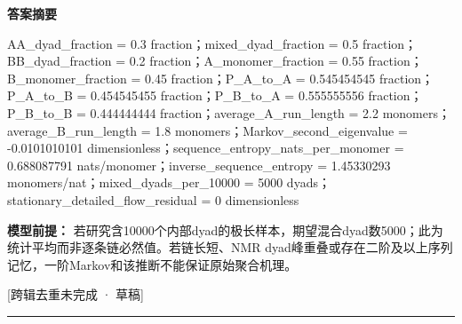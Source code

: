 \documentclass[UTF8,11pt,a4paper]{ctexart}
\begin{document}
\noindent\textbf{答案摘要}\par
AA\_dyad\_fraction = 0.3 fraction；mixed\_dyad\_fraction = 0.5 fraction；BB\_dyad\_fraction = 0.2 fraction；A\_monomer\_fraction = 0.55 fraction；B\_monomer\_fraction = 0.45 fraction；P\_A\_to\_A = 0.545454545 fraction；P\_A\_to\_B = 0.454545455 fraction；P\_B\_to\_A = 0.555555556 fraction；P\_B\_to\_B = 0.444444444 fraction；average\_A\_run\_length = 2.2 monomers；average\_B\_run\_length = 1.8 monomers；Markov\_second\_eigenvalue = -0.0101010101 dimensionless；sequence\_entropy\_nats\_per\_monomer = 0.688087791 nats/monomer；inverse\_sequence\_entropy = 1.45330293 monomers/nat；mixed\_dyads\_per\_10000 = 5000 dyads；stationary\_detailed\_flow\_residual = 0 dimensionless\par
\noindent\textbf{模型前提：}
若研究含10000个内部dyad的极长样本，期望混合dyad数5000；此为统计平均而非逐条链必然值。若链长短、NMR dyad峰重叠或存在二阶及以上序列记忆，一阶Markov和该推断不能保证原始聚合机理。\par
\noindent\textcolor{red!65!black}{[跨辑去重未完成 · 草稿]} \par
\medskip\hrule\medskip
{}
\end{document}
